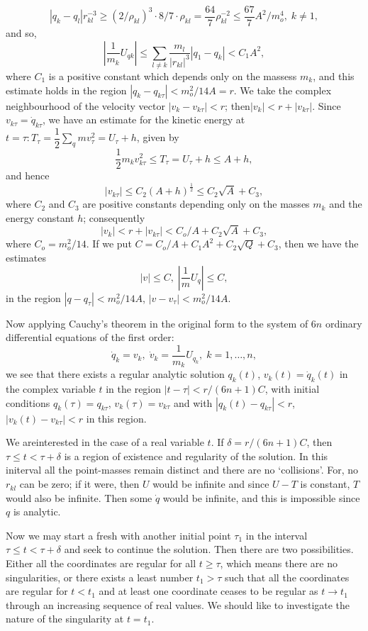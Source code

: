 $$
|q_k - q_l| r^{-3}_{kl} \geq (2/\rho_{kl})^3 \cdot 8/7 \cdot \rho_{kl} = \frac{64}{7} \rho^{-2}_{kl} \leq \frac{67}{7} A^2/m^4_o, \; k \neq 1, 
$$
and so,
$$
\left|\frac{1}{m_k} U_{qk} \right| \leq \sum\limits_{l\neq k} \frac{m_l}{|r_{kl}|^3}|q_1 - q_k| < C_1 A^2,
$$
where $C_1$ is a positive constant which depends only on the massess $m_k$, and this estimate holds in the region $|q_k  - q_{k\tau}| < m^2_o /14A = r$. We take the complex neighbourhood of the velocity vector $|v_k - v_{k\tau}|<r$; then\pageoriginale $|v_k| < r + |v_{k\tau}|$. Since $v_{k\tau} = \dot{q}_{k\tau}$, we have an estimate for the kinetic energy at $t = \tau: T_\tau = \dfrac{1}{2} \sum\limits_q m v^2_\tau = U_\tau + h$, given by
$$
\frac{1}{2} m_k v^2_{k\tau} \leq T_\tau = U_\tau + h \leq A + h,
$$
and hence 
$$
|v_{k\tau}| \leq C_2 (A + h)^{\frac{1}{2}} \leq C_2 \sqrt{A} + C_3, 
$$
where $C_2$ and $C_3$ are positive constants depending only on the masses $m_k$ and the energy constant $h$; consequently
$$
|v_k| <r + |v_{k\tau}| < C_o/A + C_2 \sqrt{A} + C_3,
$$
where $C_o = m^2_o/14$. If we put $C = C_o/A + C_1 A^2 + C_2 \sqrt{Q} + C_3$, then we have the estimates
$$
|v| \leq C, \; |\frac{1}{m} U_q| \leq C,
$$
in the region $|q-q_\tau| < m^2_o / 14A$, \; $|v-v_\tau| < m^2_o /14A$.

Now applying Cauchy's theorem in the original form to the system of $6n$ ordinary differential equations of the first order:
$$
\dot{q}_k = v_k , \; \dot{v}_k =\frac{1}{m_k} U_{q_k}, \; k =1 , \ldots, n,
$$
we see that there exists a regular analytic solution $q_k(t)$, $v_k(t) = \dot{q}_k(t)$ in the complex variable $t$ in the region $|t-\tau|< r / (6n+1)C$, with initial conditions $q_k(\tau) = q_{k \tau}$, $v_k(\tau) = v_{k\tau}$ and with $|q_k(t) - q_{k\tau}| < r$, $|v_k(t) - v_{k\tau}|<r$ in this region.

We are\pageoriginale interested in the case of a real variable $t$. If $\delta =r / (6n+1) C$, then $\tau \leq t < \tau + \delta$ is a region of existence and regularity of the solution. In this initerval all the point-masses remain distinct and there are no `collisions'. For, no $r_{kl}$ can be zero; if it were, then $U$ would be infinite and since $U-T$ is constant, $T$ would also be infinite. Then some $\dot{q}$ would be infinite, and this is impossible since $q$ is analytic.

Now we may start a fresh with another initial point $\tau_1$ in the interval $\tau \leq t < \tau + \delta$ and seek to continue the solution. Then there are two possibilities. Either all the coordinates are regular for all $t \geq \tau$, which means there are no singularities, or there exists a least number $t_1 > \tau$ such that all the coordinates are regular for $t<t_1$ and at least one coordinate ceases to be regular as $t \to t_1$ through an increasing sequence of real values. We should like to investigate the nature of the singularity at $t=t_1$.


